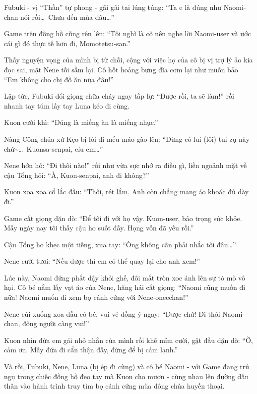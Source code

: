 \documentclass[../main.tex]{subfiles}
\begin{document}
Fubuki - vị ``Thần'' tự phong - gãi gãi tai lúng túng: ``Ta e là đúng như Naomi-chan nói rồi\dots\ Chưa đến mùa đâu\dots''

Game trên đồng hồ cũng rên lên: ``Tôi nghĩ là cô nên nghe lời Naomi-user và ước cái gì đó thực tế hơn đi, Momotetsu-san.''

Thấy nguyện vọng của mình bị từ chối, cộng với việc họ của cô bị vị trợ lý ảo kia đọc sai, mặt Nene tối sầm lại. Cô hốt hoảng bưng đĩa cơm lại như muốn bảo ``Em không cho chị đồ ăn nữa đâu!''


Lập tức, Fubuki đổi giọng chữa cháy ngay tắp lự: ``Được rồi, ta sẽ làm!'' rồi nhanh tay túm lấy tay Luna kéo đi cùng.

Kuon cười khì: ``Đúng là miếng ăn là miếng nhục.''

Nàng Công chúa xứ Kẹo bị lôi đi mếu máo gào lên: ``Đừng có lui (lôi) tui zụ này chứ\~{}\dots\ Kuonsa-senpai, cíu em\dots''

Nene hớn hở: ``Đi thôi nào!'' rồi như vừa sực nhớ ra điều gì, liền ngoảnh mặt về cậu Tổng hỏi: ``À, Kuon-senpai, anh đi không?''

Kuon xoa xoa cổ lắc đầu: ``Thôi, rét lắm. Anh còn chẳng mang áo khoác đủ dày đi.''

Game cất giọng dặn dò: ``Để tôi đi với họ vậy. Kuon-user, bảo trọng sức khỏe. Mấy ngày nay tôi thấy cậu ho suốt đấy. Họng vốn đã yếu rồi.''

Cậu Tổng ho khẹc một tiếng, xua tay: ``Ông không cần phải nhắc tôi đâu\dots''

Nene cười tươi: ``Nếu được thì em có thể quay lại cho anh xem!''

Lúc này, Naomi đứng phắt dậy khỏi ghế, đôi mắt tròn xoe ánh lên sự tò mò vô hại. Cô bé nắm lấy vạt áo của Nene, hăng hái cất giọng: ``Naomi cũng muốn đi nữa! Naomi muốn đi xem bọ cánh cứng với Nene-oneechan!''

Nene cúi xuống xoa đầu cô bé, vui vẻ đồng ý ngay: ``Được chứ! Đi thôi Naomi-chan, đông người càng vui!''

Kuon nhìn đứa em gái nhỏ nhắn của mình rồi khẽ mỉm cười, gật đầu dặn dò: ``Ờ, cảm ơn. Mấy đứa đi cẩn thận đấy, đừng để bị cảm lạnh.''

\ct

Và rồi, Fubuki, Nene, Luna (bị ép đi cùng) và cô bé Naomi - với Game đang trú ngụ trong chiếc đồng hồ đeo tay mà Kuon cho mượn - cùng nhau lên đường dấn thân vào hành trình truy tìm bọ cánh cứng mùa đông chúa huyền thoại.
\end{document}
